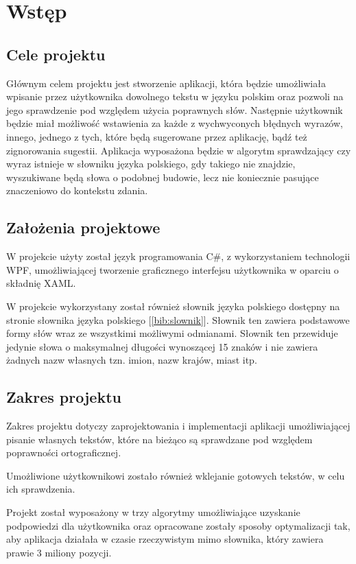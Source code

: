\chapter{Wstęp}

\section{Cele projektu}

Głównym celem projektu jest stworzenie aplikacji, która będzie umożliwiała wpisanie przez użytkownika dowolnego tekstu w języku polskim oraz pozwoli na jego sprawdzenie pod względem użycia poprawnych słów. Następnie użytkownik będzie miał możliwość wstawienia za każde z wychwyconych błędnych wyrazów, innego, jednego z tych, które będą sugerowane przez aplikację, bądź też zignorowania sugestii. Aplikacja wyposażona będzie w algorytm sprawdzający czy wyraz istnieje w słowniku języka polskiego, gdy takiego nie znajdzie, wyszukiwane będą słowa o podobnej budowie, lecz nie koniecznie pasujące znaczeniowo do kontekstu zdania.

\section{Założenia projektowe}

W projekcie użyty został język programowania C\#, z wykorzystaniem technologii WPF, umożliwiającej tworzenie graficznego interfejsu użytkownika w oparciu o składnię XAML.

W projekcie wykorzystany został również słownik języka polskiego dostępny na stronie słownika języka polskiego [\ref{bib:slownik}]. Słownik ten zawiera podstawowe formy słów wraz ze wszystkimi możliwymi odmianami. Słownik ten przewiduje jedynie słowa o maksymalnej długości wynoszącej 15 znaków i nie zawiera żadnych nazw własnych tzn. imion, nazw krajów, miast itp.

\section{Zakres projektu}
Zakres projektu dotyczy zaprojektowania i implementacji aplikacji umożliwiającej pisanie własnych tekstów, które na bieżąco są sprawdzane pod względem poprawności ortograficznej.

Umożliwione użytkownikowi zostało również wklejanie gotowych tekstów, w celu ich sprawdzenia.

Projekt został wyposażony w trzy algorytmy umożliwiające uzyskanie podpowiedzi dla użytkownika oraz opracowane zostały sposoby optymalizacji tak, aby aplikacja działała w czasie rzeczywistym mimo słownika, który zawiera prawie 3 miliony pozycji.

